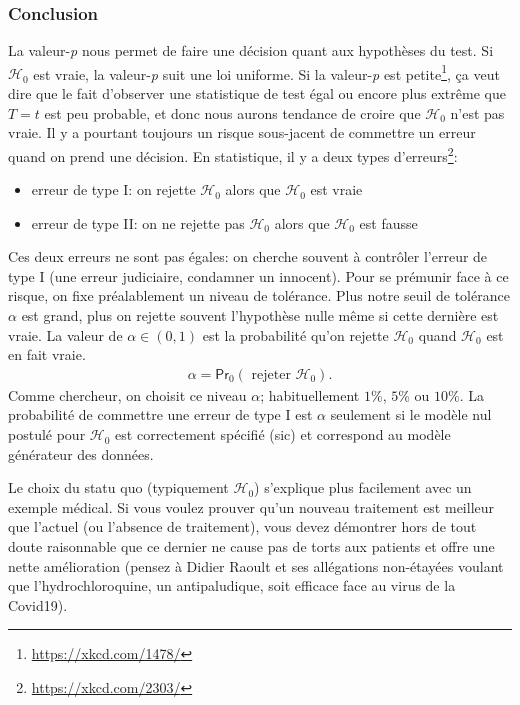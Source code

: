 \documentclass[
  11pt,
  letterpaper,
]{article}
\providecommand{\tightlist}{%
  \setlength{\itemsep}{0pt}\setlength{\parskip}{0pt}}
\renewcommand{\href}[2]{#2\footnote{\url{#1}}}
\theoremstyle{definition}
\theoremstyle{definition}
\theoremstyle{definition}
\theoremstyle{definition}
\theoremstyle{remark}
\begin{document}
\hypertarget{conclusion}{%
\subsubsection{Conclusion}\label{conclusion}}

La valeur-\emph{p} nous permet de faire une décision quant aux hypothèses du test. Si \(\mathscr{H}_0\) est vraie, la valeur-\emph{p} suit une loi uniforme. \href{https://xkcd.com/1478/}{Si la valeur-\emph{p} est petite}, ça veut dire que le fait d'observer une statistique de test égal ou encore plus extrême que \(T=t\) est peu probable, et donc nous aurons tendance de croire que \(\mathscr{H}_0\) n'est pas vraie. Il y a pourtant toujours un risque sous-jacent de commettre un erreur quand on prend une décision. En statistique, il y a \href{https://xkcd.com/2303/}{deux types d'erreurs}:

\begin{itemize}
\tightlist
\item
  erreur de type I: on rejette \(\mathscr{H}_0\) alors que \(\mathscr{H}_0\) est vraie
\item
  erreur de type II: on ne rejette pas \(\mathscr{H}_0\) alors que \(\mathscr{H}_0\) est fausse
\end{itemize}

Ces deux erreurs ne sont pas égales: on cherche souvent à contrôler l'erreur de type I (une erreur judiciaire, condamner un innocent). Pour se prémunir face à ce risque, on fixe préalablement un niveau de tolérance. Plus notre seuil de tolérance \(\alpha\) est grand, plus on rejette souvent l'hypothèse nulle même si cette dernière est vraie.
La valeur de \(\alpha \in (0, 1)\) est la probabilité qu'on rejette \(\mathscr{H}_0\) quand \(\mathscr{H}_0\) est en fait vraie.
\begin{align*}
\alpha = \mathsf{Pr}_0\left(\text{ rejeter } \mathscr{H}_0\right).
\end{align*}
Comme chercheur, on choisit ce niveau \(\alpha\); habituellement \(1\)\%, \(5\)\% ou \(10\)\%. La probabilité de commettre une erreur de type I est \(\alpha\) seulement si le modèle nul postulé pour \(\mathscr{H}_0\) est correctement spécifié (sic) et correspond au modèle générateur des données.

Le choix du statu quo (typiquement \(\mathscr{H}_0\)) s'explique plus facilement avec un exemple médical. Si vous voulez prouver qu'un nouveau traitement est meilleur que l'actuel (ou l'absence de traitement), vous devez démontrer hors de tout doute raisonnable que ce dernier ne cause pas de torts aux patients et offre une nette amélioration (pensez à Didier Raoult et ses allégations non-étayées voulant que l'hydrochloroquine, un antipaludique, soit efficace face au virus de la Covid19).
\end{document}
